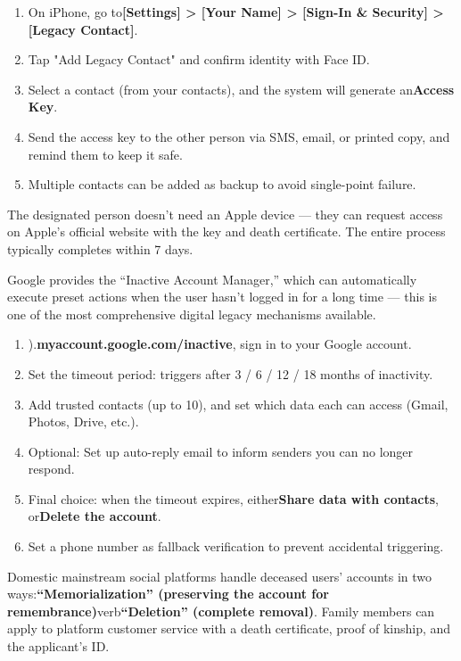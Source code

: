 \begin{enumerate}
  \item On iPhone, go to\textbf{[Settings] > [Your Name] > [Sign-In \& Security] > [Legacy Contact]}.
  \item Tap "Add Legacy Contact" and confirm identity with Face ID.
  \item Select a contact (from your contacts), and the system will generate an\textbf{Access Key}.
  \item Send the access key to the other person via SMS, email, or printed copy, and remind them to keep it safe.
  \item Multiple contacts can be added as backup to avoid single-point failure.
\end{enumerate}

The designated person doesn't need an Apple device — they can request access on Apple's official website with the key and death certificate. The entire process typically completes within 7 days.


Google provides the “Inactive Account Manager,” which can automatically execute preset actions when the user hasn't logged in for a long time — this is one of the most comprehensive digital legacy mechanisms available.

\begin{enumerate}
  \item ).\textbf{myaccount.google.com/inactive}, sign in to your Google account.
  \item Set the timeout period: triggers after 3 / 6 / 12 / 18 months of inactivity.
  \item Add trusted contacts (up to 10), and set which data each can access (Gmail, Photos, Drive, etc.).
  \item Optional: Set up auto-reply email to inform senders you can no longer respond.
  \item Final choice: when the timeout expires, either\textbf{Share data with contacts}, or\textbf{Delete the account}.
  \item Set a phone number as fallback verification to prevent accidental triggering.
\end{enumerate}


Domestic mainstream social platforms handle deceased users' accounts in two ways:\textbf{“Memorialization” (preserving the account for remembrance)}verb\textbf{“Deletion” (complete removal)}. Family members can apply to platform customer service with a death certificate, proof of kinship, and the applicant's ID.

